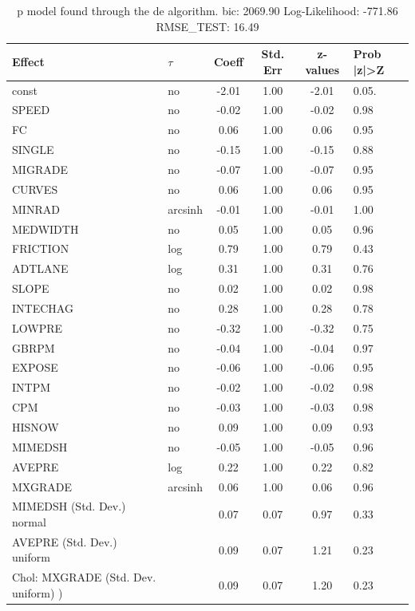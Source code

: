 \begin{table}
	\caption{p model found through the de algorithm. bic: 2069.90 Log-Likelihood: -771.86 RMSE_TEST: 16.49}
	\begin{center}
		\begin{tabular}{|l|l|c|c|c|l|}
			\hline
			Effect & $\tau$ & Coeff & Std. Err & z-values & Prob |z|>Z \\
			\hline
			const & no & -2.01 & 1.00 & -2.01 & 0.05. \\
			\hline
			SPEED & no & -0.02 & 1.00 & -0.02 & 0.98 \\
			\hline
			FC & no & 0.06 & 1.00 & 0.06 & 0.95 \\
			\hline
			SINGLE & no & -0.15 & 1.00 & -0.15 & 0.88 \\
			\hline
			MIGRADE & no & -0.07 & 1.00 & -0.07 & 0.95 \\
			\hline
			CURVES & no & 0.06 & 1.00 & 0.06 & 0.95 \\
			\hline
			MINRAD & arcsinh & -0.01 & 1.00 & -0.01 & 1.00 \\
			\hline
			MEDWIDTH & no & 0.05 & 1.00 & 0.05 & 0.96 \\
			\hline
			FRICTION & log & 0.79 & 1.00 & 0.79 & 0.43 \\
			\hline
			ADTLANE & log & 0.31 & 1.00 & 0.31 & 0.76 \\
			\hline
			SLOPE & no & 0.02 & 1.00 & 0.02 & 0.98 \\
			\hline
			INTECHAG & no & 0.28 & 1.00 & 0.28 & 0.78 \\
			\hline
			LOWPRE & no & -0.32 & 1.00 & -0.32 & 0.75 \\
			\hline
			GBRPM & no & -0.04 & 1.00 & -0.04 & 0.97 \\
			\hline
			EXPOSE & no & -0.06 & 1.00 & -0.06 & 0.95 \\
			\hline
			INTPM & no & -0.02 & 1.00 & -0.02 & 0.98 \\
			\hline
			CPM & no & -0.03 & 1.00 & -0.03 & 0.98 \\
			\hline
			HISNOW & no & 0.09 & 1.00 & 0.09 & 0.93 \\
			\hline
			MIMEDSH & no & -0.05 & 1.00 & -0.05 & 0.96 \\
			\hline
			AVEPRE & log & 0.22 & 1.00 & 0.22 & 0.82 \\
			\hline
			MXGRADE & arcsinh & 0.06 & 1.00 & 0.06 & 0.96 \\
			\hline
			MIMEDSH (Std. Dev.) normal &  & 0.07 & 0.07 & 0.97 & 0.33 \\
			\hline
			AVEPRE (Std. Dev.) uniform &  & 0.09 & 0.07 & 1.21 & 0.23 \\
			\hline
			 Chol: MXGRADE (Std. Dev. uniform) ) &  & 0.09 & 0.07 & 1.20 & 0.23 \\
			\hline
		\end{tabular}
	\end{center}
\end{table}